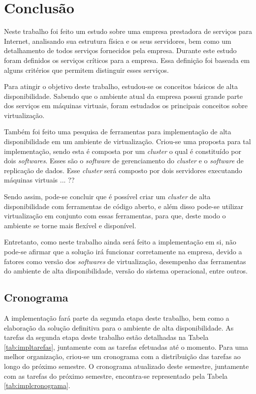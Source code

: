 \chapter{Conclusão}
\label{cap:conclusao}

Neste trabalho foi feito um estudo sobre uma empresa prestadora de serviços para Internet, analisando sua estrutura física e os seus servidores, 
bem como um detalhamento de todos serviços fornecidos pela empresa. Durante este estudo foram definidos os serviços críticos para a empresa.
Essa definição foi baseada em alguns critérios que permitem distinguir esses serviços.

Para atingir o objetivo deste trabalho, estudou-se os conceitos básicos de alta disponibilidade. Sabendo que o ambiente atual da empresa possui 
grande parte dos serviços em máquinas virtuais, foram estudados os principais conceitos sobre virtualização.

Também foi feito uma pesquisa de ferramentas para implementação de alta disponibilidade em um ambiente de virtualização. Criou-se uma proposta 
para tal implementação, sendo esta é composta por um \textit{cluster} o qual é constituído por dois \textit{softwares}. Esses são o 
\textit{software} de gerenciamento do \textit{cluster} e o \textit{software} de replicação de dados.
Esse \textit{cluster} será composto por dois servidores executando máquinas virtuais ... ??

Sendo assim, pode-se concluir que é possível criar um \textit{cluster} de alta disponibilidade com ferramentas de código aberto, e além disso 
pode-se utilizar virtualização em conjunto com essas ferramentas, para que, deste modo o ambiente se torne mais flexível e disponível. 

Entretanto, como neste trabalho ainda será feito a implementação em si, não pode-se afirmar que a solução irá funcionar corretamente
na empresa, devido a fatores como versão dos \textit{softwares} de virtualização, desempenho das ferramentas do ambiente de alta disponibilidade, 
versão do sistema operacional, entre outros.

\newpage
\section{Cronograma}
\label{section:cronograma}

A implementação fará parte da segunda etapa deste trabalho, bem como a elaboração da solução definitiva para o ambiente de alta disponibilidade. 
As tarefas da segunda etapa deste trabalho estão detalhadas na Tabela \ref{tab:impltarefas}, juntamente com as tarefas efetuadas até o momento. 
Para uma melhor organização, criou-se um cronograma com a distribuição das tarefas ao longo do próximo semestre. O cronograma atualizado 
deste semestre, juntamente com as tarefas do próximo semestre, encontra-se representado pela Tabela \ref{tab:implcronograma}.

